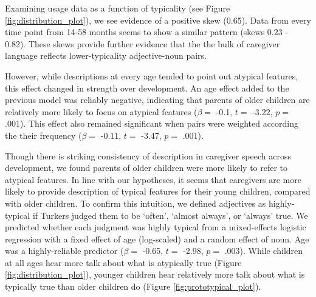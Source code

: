 \documentclass[10pt, letterpaper]{article}
\begin{document}
Examining usage data as a function of typicality (see Figure
\ref{fig:distribution_plot}), we see evidence of a positive skew (0.65).
Data from every time point from 14-58 months seems to show a similar
pattern (skews 0.23 - 0.82). These skews provide further evidence that
the the bulk of caregiver language reflects lower-typicality
adjective-noun pairs.

However, while descriptions at every age tended to point out atypical
features, this effect changed in strength over development. An age
effect added to the previous model was reliably negative, indicating
that parents of older children are relatively more likely to focus on
atypical features (\(\beta =\) -0.1, \(t =\) -3.22, \(p =\) .001). This
effect also remained significant when pairs were weighted according the
their frequency (\(\beta =\) -0.11, \(t =\) -3.47, \(p =\) .001).

Though there is striking consistency of description in caregiver speech
across development, we found parents of older children were more likely
to refer to atypical features. In line with our hypotheses, it seems
that caregivers are more likely to provide description of typical
features for their young children, compared with older children. To
confirm this intuition, we defined adjectives as highly-typical if
Turkers judged them to be `often', `almost always', or `always' true. We
predicted whether each judgment was highly typical from a mixed-effects
logistic regression with a fixed effect of age (log-scaled) and a random
effect of noun. Age was a highly-reliable predictor (\(\beta =\) -0.65,
\(t =\) -2.98, \(p =\) .003). While children at all ages hear more talk
about what is atypically true (Figure \ref{fig:distribution_plot}),
younger children hear relatively more talk about what is typically true
than older children do (Figure \ref{fig:prototypical_plot}).
\end{document}

